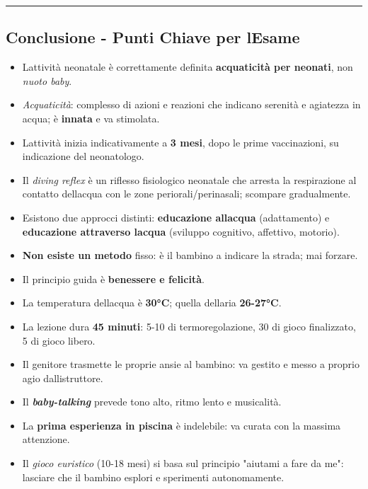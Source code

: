 \documentclass[a4paper,11pt]{article}
\providecommand{\tightlist}{%
  \setlength{\itemsep}{0pt}\setlength{\parskip}{0pt}}
\begin{document}
\begin{center}\rule{0.5\linewidth}{0.5pt}\end{center}

\subsection{Conclusione - Punti Chiave per
      l\textquotesingle Esame}\label{conclusione---punti-chiave-per-lesame-6}

\begin{itemize}
      \tightlist
      \item
            L\textquotesingle attività neonatale è correttamente definita
            \textbf{acquaticità per neonati}, non \emph{nuoto baby}.
      \item
            \emph{Acquaticità}: complesso di azioni e reazioni che indicano
            serenità e agiatezza in acqua; è \textbf{innata} e va stimolata.
      \item
            L\textquotesingle attività inizia indicativamente a \textbf{3 mesi},
            dopo le prime vaccinazioni, su indicazione del neonatologo.
      \item
            Il \emph{diving reflex} è un riflesso fisiologico neonatale che
            arresta la respirazione al contatto dell\textquotesingle acqua con le
            zone periorali/perinasali; scompare gradualmente.
      \item
            Esistono due approcci distinti: \textbf{educazione
                  all\textquotesingle acqua} (adattamento) e \textbf{educazione
                  attraverso l\textquotesingle acqua} (sviluppo cognitivo, affettivo,
            motorio).
      \item
            \textbf{Non esiste un metodo} fisso: è il bambino a indicare la
            strada; mai forzare.
      \item
            Il principio guida è \textbf{benessere e felicità}.
      \item
            La temperatura dell\textquotesingle acqua è \textbf{30°C}; quella
            dell\textquotesingle aria \textbf{26-27°C}.
      \item
            La lezione dura \textbf{45 minuti}: 5-10 di termoregolazione, 30 di
            gioco finalizzato, 5 di gioco libero.
      \item
            Il genitore trasmette le proprie ansie al bambino: va gestito e messo
            a proprio agio dall\textquotesingle istruttore.
      \item
            Il \textbf{\emph{baby-talking}} prevede tono alto, ritmo lento e
            musicalità.
      \item
            La \textbf{prima esperienza in piscina} è indelebile: va curata con la
            massima attenzione.
      \item
            Il \emph{gioco euristico} (10-18 mesi) si basa sul principio "aiutami
            a fare da me": lasciare che il bambino esplori e sperimenti
            autonomamente.
\end{itemize}
\end{document}
